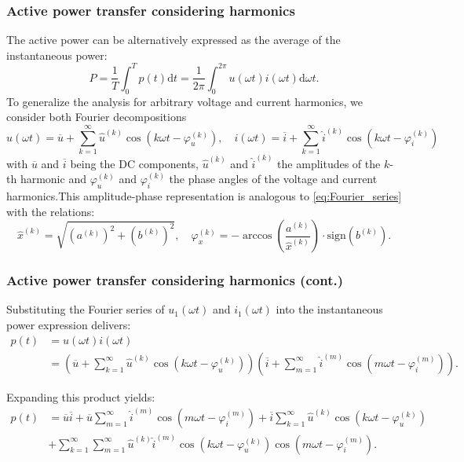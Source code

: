 \begin{frame}
    \frametitle{Active power transfer considering harmonics}
    The active power can be alternatively expressed as the average of the instantaneous power:
    \begin{equation}
        P = \frac{1}{T} \int_{0}^{T} p(t) \mathrm{d}t = \frac{1}{2\pi} \int_{0}^{2\pi} u(\omega t) i(\omega t) \mathrm{d}\omega t.
    \end{equation}\pause
    To generalize the analysis for arbitrary voltage and current harmonics, we consider both  Fourier decompositions
    \begin{equation}
            u(\omega t) = \overline{u} + \sum_{k=1}^{\infty} \hat{u}^{(k)}\cos(k\omega t -\varphi_u^{(k)}),\quad 
            i(\omega t) = \overline{i} + \sum_{k=1}^{\infty} \hat{i}^{(k)}\cos(k\omega t -\varphi_i^{(k)})
    \end{equation}
    with $\overline{u}$ and $\overline{i}$ being the DC components, $\hat{u}^{(k)}$ and $\hat{i}^{(k)}$ the amplitudes of the $k$-th harmonic and $\varphi_u^{(k)}$ and $\varphi_i^{(k)}$ the phase angles of the voltage and current harmonics.\pause This amplitude-phase representation is analogous to \eqref{eq:Fourier_series} with the relations:
    \begin{equation}
            \hat{x}^{(k)} = \sqrt{(a^{(k)})^2 + (b^{(k)})^2}, \quad \varphi_x^{(k)} = -\arccos\left(\frac{a^{(k)}}{\hat{x}^{(k)}}\right) \cdot \mathrm{sign}\left(b^{(k)}\right).
    \end{equation}
\end{frame}

\begin{frame}
    \frametitle{Active power transfer considering harmonics (cont.)}
Substituting the Fourier series of \(u_1(\omega t)\) and \(i_1(\omega t)\) into the instantaneous power expression delivers:
\begin{align*}
    p(t) &= u(\omega t) i(\omega t) \\
    &= \left( \overline{u} + \sum_{k=1}^\infty \hat{u}^{(k)} \cos(k\omega t - \varphi_u^{(k)}) \right)
    \left( \overline{i} + \sum_{m=1}^\infty \hat{i}^{(m)} \cos(m\omega t - \varphi_i^{(m)}) \right).
\end{align*}\pause

Expanding this product yields:
\begin{align*}
    p(t) &= \overline{u} \overline{i} 
    + \overline{u} \sum_{m=1}^\infty \hat{i}^{(m)} \cos(m\omega t - \varphi_i^{(m)}) 
    + \overline{i} \sum_{k=1}^\infty \hat{u}^{(k)} \cos(k\omega t - \varphi_u^{(k)}) \\
    &+ \sum_{k=1}^\infty \sum_{m=1}^\infty \hat{u}^{(k)} \hat{i}^{(m)} 
    \cos(k\omega t - \varphi_u^{(k)}) \cos(m\omega t - \varphi_i^{(m)}).
\end{align*}

\end{frame}

